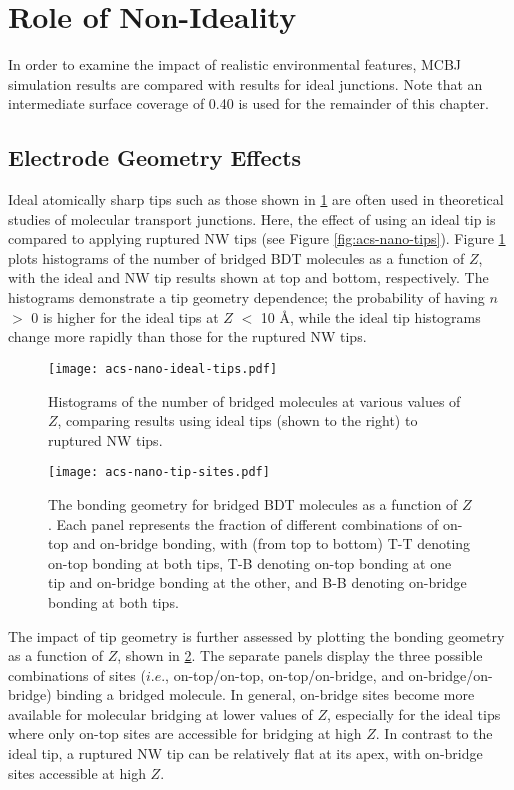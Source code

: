 \documentclass[10pt]{report}  %
\newcommand\findent{\hspace*{\parindent}}
\begin{document}
\section{Role of Non-Ideality}

\findent In order to examine the impact of realistic environmental features, MCBJ simulation results are compared with results for ideal junctions. Note that an intermediate surface coverage of 0.40 is used for the remainder of this chapter. 

\subsection{Electrode Geometry Effects}

\findent Ideal atomically sharp tips such as those shown in \ref{fig:acs-nano-ideal-tips} are often used in theoretical studies of molecular transport junctions. \cite{Emberly:2001,Weber:2002,Li:2008,Mishchenko:2010,Frei:2011} Here, the effect of using an ideal tip is compared to applying ruptured NW tips (see Figure \ref{fig:acs-nano-tips}). Figure \ref{fig:acs-nano-ideal-tips} plots histograms of the number of bridged BDT molecules as a function of $Z$, with the ideal and NW tip results shown at top and bottom, respectively. The histograms demonstrate a tip geometry dependence; the probability of having $n$ $>$ 0 is higher for the ideal tips at $Z$ $<$ 10 \AA, while the ideal tip histograms change more rapidly than those for the ruptured NW tips.

\begin{figure}[h]
	\centering
	\texttt{[image: acs-nano-ideal-tips.pdf]}
	\caption{Histograms of the number of bridged molecules at various values of $Z$, comparing results using ideal tips (shown to the right) to ruptured NW tips.}
	\label{fig:acs-nano-ideal-tips}
\end{figure}

\begin{figure}[h!]
	\centering
	\texttt{[image: acs-nano-tip-sites.pdf]}
	\caption{The bonding geometry for bridged BDT molecules as a function of $Z$.  Each panel represents the fraction of different combinations of on-top and on-bridge bonding, with (from top to bottom) T-T denoting on-top bonding at both tips, T-B denoting on-top bonding at one tip and on-bridge bonding at the other, and B-B denoting on-bridge bonding at both tips.}
	\label{fig:acs-nano-tip-sites}
\end{figure}

The impact of tip geometry is further assessed by plotting the bonding geometry as a function of $Z$, shown in \ref{fig:acs-nano-tip-sites}.  The separate panels display the three possible combinations of sites ($i.e.$, on-top/on-top, on-top/on-bridge, and on-bridge/on-bridge) binding a bridged molecule.  In general, on-bridge sites become more available for molecular bridging at lower values of $Z$, especially for the ideal tips where only on-top sites are accessible for bridging at high $Z$.  In contrast to the ideal tip, a ruptured NW tip can be relatively flat at its apex, with on-bridge sites accessible at high $Z$.  
\end{document}
